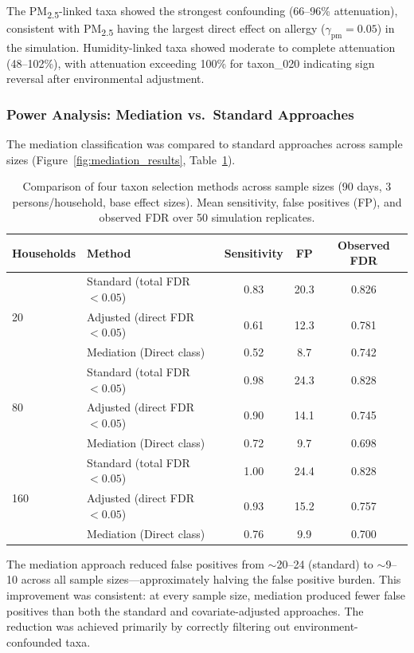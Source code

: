 \documentclass[11pt,letterpaper]{article}
\begin{document}
The PM\textsubscript{2.5}-linked taxa showed the strongest confounding (66--96\% attenuation), consistent with PM\textsubscript{2.5} having the largest direct effect on allergy ($\gamma_{\text{pm}} = 0.05$) in the simulation. Humidity-linked taxa showed moderate to complete attenuation (48--102\%), with attenuation exceeding 100\% for taxon\_020 indicating sign reversal after environmental adjustment.

\subsubsection{Power Analysis: Mediation vs.\ Standard Approaches}

The mediation classification was compared to standard approaches across sample sizes (Figure~\ref{fig:mediation_results}, Table~\ref{tab:mediation_power}).

\begin{table}[H]
\centering
\caption{Comparison of four taxon selection methods across sample sizes (90 days, 3 persons/household, base effect sizes). Mean sensitivity, false positives (FP), and observed FDR over 50 simulation replicates.}
\label{tab:mediation_power}
\begin{tabular}{@{}llccc@{}}
\toprule
Households & Method & Sensitivity & FP & Observed FDR \\
\midrule
\multirow{3}{*}{20} & Standard (total FDR $< 0.05$) & 0.83 & 20.3 & 0.826 \\
 & Adjusted (direct FDR $< 0.05$) & 0.61 & 12.3 & 0.781 \\
 & Mediation (Direct class) & 0.52 & 8.7 & 0.742 \\
\midrule
\multirow{3}{*}{80} & Standard (total FDR $< 0.05$) & 0.98 & 24.3 & 0.828 \\
 & Adjusted (direct FDR $< 0.05$) & 0.90 & 14.1 & 0.745 \\
 & Mediation (Direct class) & 0.72 & 9.7 & 0.698 \\
\midrule
\multirow{3}{*}{160} & Standard (total FDR $< 0.05$) & 1.00 & 24.4 & 0.828 \\
 & Adjusted (direct FDR $< 0.05$) & 0.93 & 15.2 & 0.757 \\
 & Mediation (Direct class) & 0.76 & 9.9 & 0.700 \\
\bottomrule
\end{tabular}
\end{table}

The mediation approach reduced false positives from $\sim$20--24 (standard) to $\sim$9--10 across all sample sizes---approximately halving the false positive burden. This improvement was consistent: at every sample size, mediation produced fewer false positives than both the standard and covariate-adjusted approaches. The reduction was achieved primarily by correctly filtering out environment-confounded taxa.
\end{document}
